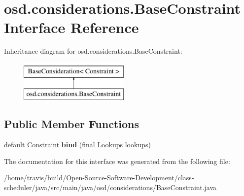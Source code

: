 \hypertarget{interfaceosd_1_1considerations_1_1_base_constraint}{\section{osd.\-considerations.\-Base\-Constraint Interface Reference}
\label{interfaceosd_1_1considerations_1_1_base_constraint}
}
Inheritance diagram for osd.\-considerations.\-Base\-Constraint\-:\begin{figure}[H]
\begin{center}
\leavevmode
\includegraphics[height=2.000000cm]{interfaceosd_1_1considerations_1_1_base_constraint}
\end{center}
\end{figure}
\subsection*{Public Member Functions}
\begin{DoxyCompactItemize}
\item 
\hypertarget{interfaceosd_1_1considerations_1_1_base_constraint_a5c706c099aecb63a10f270dd1466f169}{default \hyperlink{interfaceosd_1_1considerations_1_1_constraint}{Constraint} {\bfseries bind} (final \hyperlink{interfaceosd_1_1considerations_1_1_lookups}{Lookups} lookups)}\label{interfaceosd_1_1considerations_1_1_base_constraint_a5c706c099aecb63a10f270dd1466f169}

\end{DoxyCompactItemize}


The documentation for this interface was generated from the following file\-:\begin{DoxyCompactItemize}
\item 
/home/travis/build/\-Open-\/\-Source-\/\-Software-\/\-Development/class-\/scheduler/java/src/main/java/osd/considerations/Base\-Constraint.\-java\end{DoxyCompactItemize}

